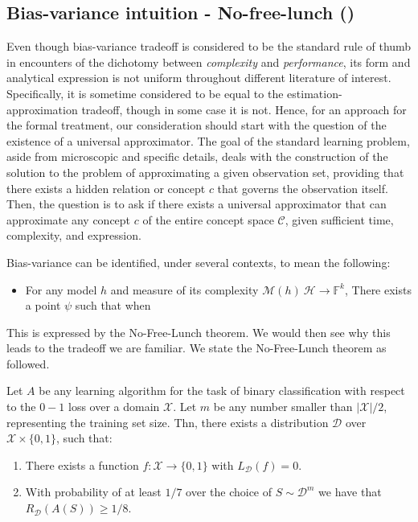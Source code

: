 \documentclass[twoside,10pt]{article}
\begin{document}
\subsection{Bias-variance intuition - No-free-lunch (\cite{10.5555/2371238})}

Even though bias-variance tradeoff is considered to be the standard rule of thumb in encounters of the dichotomy between \textit{complexity} and \textit{performance}, its form and analytical expression is not uniform throughout different literature of interest. Specifically, it is sometime considered to be equal to the estimation-approximation tradeoff, though in some case it is not. Hence, for an approach for the formal treatment, our consideration should start with the question of the existence of a universal approximator. The goal of the standard learning problem, aside from microscopic and specific details, deals with the construction of the solution to the problem of approximating a given observation set, providing that there exists a hidden relation or concept $c$ that governs the observation itself. Then, the question is to ask if there exists a universal approximator that can approximate any concept $c$ of the entire concept space $\mathcal{C}$, given sufficient time, complexity, and expression. 

\begin{conjecture}
    Bias-variance can be identified, under several contexts, to mean the following: \begin{itemize}
        \item For any model $h$ and measure of its complexity $\mathcal{M}(h)\:\mathcal{H}\to \mathbb{F}^{k}$, There exists a point $\psi$ such that when
    \end{itemize}
\end{conjecture}

This is expressed by the No-Free-Lunch theorem. We would then see why this leads to the tradeoff we are familiar. We state the No-Free-Lunch theorem as followed.

\begin{theorem}
    Let $A$ be any learning algorithm for the task of binary classification with respect to the $0-1$ loss over a domain $\mathcal{X}$. Let $m$ be any number smaller than $|\mathcal{X}|/2$, representing the training set size. Thn, there exists a distribution $\mathcal{D}$ over $\mathcal{X}\times \{0,1\}$, such that: 
    \begin{enumerate}
        \item There exists a function $f:\mathcal{X}\to \{0,1\}$ with $L_{\mathcal{D}}(f)= 0$. 
        \item With probability of at least $1/7$ over the choice of $S\sim \mathcal{D}^{m}$ we have that $R_{\mathcal{D}}(A(S))\geq 1/8$. 
    \end{enumerate}
\end{theorem}
\end{document}
